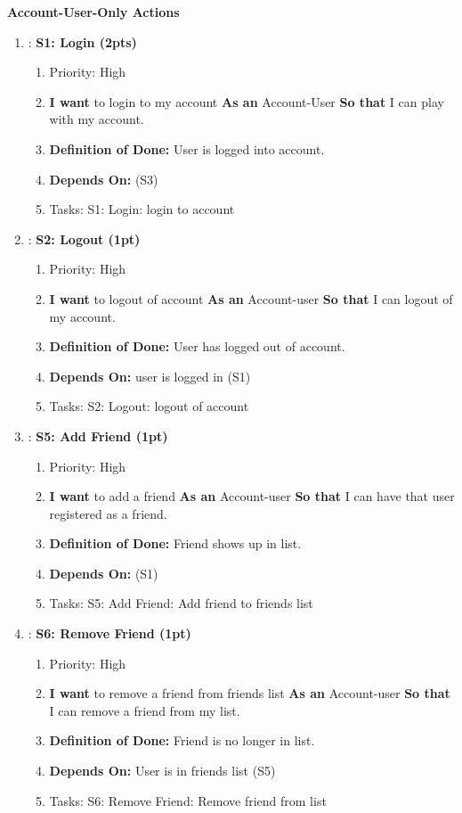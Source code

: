 \textbf{Account-User-Only Actions}
\begin{enumerate}[nosep]
    \item: \textbf{S1: Login (2pts)}
    \begin{enumerate}[nosep]
        \item Priority: High 
        \item \textbf{I want} to login to my account \textbf{As an} Account-User \textbf{So that} I can play with my account.
        \item \textbf{Definition of Done:} User is logged into account.
        \item \textbf{Depends On:} (S3)
        \item Tasks: S1: Login: login to account
    \end{enumerate}

    \item: \textbf{S2: Logout (1pt)}
    \begin{enumerate}[nosep]
        \item Priority: High 
        \item \textbf{I want} to logout of account \textbf{As an} Account-user \textbf{So that} I can logout of my account.
        \item \textbf{Definition of Done:} User has logged out of account.
        \item \textbf{Depends On:} user is logged in (S1)
        \item Tasks: S2: Logout: logout of account
    \end{enumerate}

    \item: \textbf{S5: Add Friend (1pt)}
    \begin{enumerate}[nosep]
        \item Priority: High 
        \item \textbf{I want} to add a friend \textbf{As an} Account-user \textbf{So that} I can have that user registered as a friend.
        \item \textbf{Definition of Done:} Friend shows up in list.
        \item \textbf{Depends On:} (S1)
        \item Tasks: S5: Add Friend: Add friend to friends list
    \end{enumerate}

    \item: \textbf{S6: Remove Friend (1pt)}
    \begin{enumerate}[nosep]
        \item Priority: High 
        \item \textbf{I want} to remove a friend from friends list \textbf{As an} Account-user \textbf{So that} I can remove a friend from my list.
        \item \textbf{Definition of Done:} Friend is no longer in list.
        \item \textbf{Depends On:} User is in friends list (S5)
        \item Tasks: S6: Remove Friend: Remove friend from list
    \end{enumerate}


\end{enumerate}
